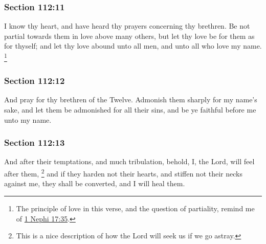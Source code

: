 	\subsubsection{Section 112:11} %
		\label{DC112-11}

		I know thy heart, and have heard thy prayers concerning thy brethren.   Be not partial towards them in love above many others, but let thy love be for them as for thyself; and let thy love abound unto all men, and unto all who love my name.%
			\footnote{%
				The principle of love in this verse, and the question of partiality, remind me of \hyperref[1NEPHI-17-35]{1 Nephi 17:35}.
				}


	\subsubsection{Section 112:12} %
		\label{DC112-12}

		And pray for thy brethren of the Twelve.  Admonish them sharply for my name's sake, and let them be admonished for all their sins, and be ye faithful before me unto my name.


	\subsubsection{Section 112:13} %
		\label{DC112-13}

		And after their temptations, and much tribulation, behold, I, the Lord, will feel after them,%
			\footnote{%
				This is a nice description of how the Lord will seek us if we go astray.
				}
		and if they harden not their hearts, and stiffen not their necks against me, they shall be converted, and I will heal them.

